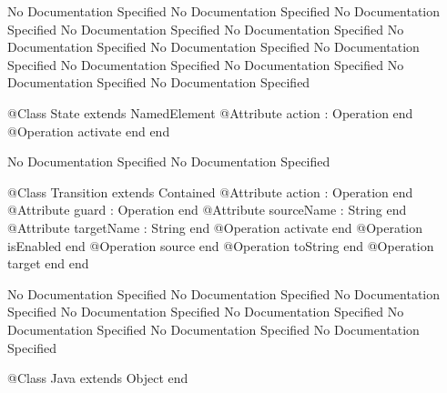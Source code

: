 No Documentation Specified
No Documentation Specified
No Documentation Specified
No Documentation Specified
No Documentation Specified
No Documentation Specified
No Documentation Specified
No Documentation Specified
No Documentation Specified
No Documentation Specified
No Documentation Specified
No Documentation Specified
\begin{Interface}
@Class State extends NamedElement
  @Attribute action : Operation end
  @Operation activate end
end
\end{Interface}
No Documentation Specified
No Documentation Specified
\begin{Interface}
@Class Transition extends Contained
  @Attribute action : Operation end
  @Attribute guard : Operation end
  @Attribute sourceName : String end
  @Attribute targetName : String end
  @Operation activate end
  @Operation isEnabled end
  @Operation source end
  @Operation toString end
  @Operation target end
end
\end{Interface}
No Documentation Specified
No Documentation Specified
No Documentation Specified
No Documentation Specified
No Documentation Specified
No Documentation Specified
No Documentation Specified
No Documentation Specified
\begin{Interface}
@Class Java extends Object
end
\end{Interface}
